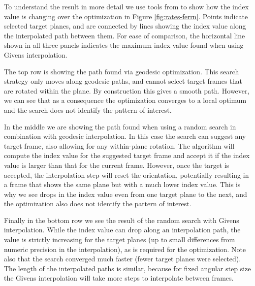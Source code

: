 To understand the result in more detail we use tools from
 \citep{ferrn} to show how the index value is changing
over the optimization in Figure \ref{fig:rates-ferrn}. Points indicate
selected target planes, and are connected by lines showing the index
value along the interpolated path between them. For ease of comparison,
the horizontal line shown in all three panels indicates the maximum
index value found when using Givens interpolation.

The top row is showing the path found via geodesic optimization. This
search strategy only moves along geodesic paths, and cannot select
target frames that are rotated within the plane. By construction this
gives a smooth path. However, we can see that as a consequence the
optimization converges to a local optimum and the search does not
identify the pattern of interest.

In the middle we are showing the path found when using a random search
in combination with geodesic interpolation. In this case the search can
suggest any target frame, also allowing for any within-plane rotation.
The algorithm will compute the index value for the suggested target
frame and accept it if the index value is larger than that for the
current frame. However, once the target is accepted, the interpolation
step will reset the orientation, potentially resulting in a frame that
shows the same plane but with a much lower index value. This is why we
see drops in the index value even from one target plane to the next, and
the optimization also does not identify the pattern of interest.

Finally in the bottom row we see the result of the random search with
Givens interpolation. While the index value can drop along an
interpolation path, the value is strictly increasing for the target
planes (up to small differences from numeric precision in the
interpolation), as is required for the optimization. Note also that the
search converged much faster (fewer target planes were selected). The
length of the interpolated paths is similar, because for fixed angular
step size the Givens interpolation will take more steps to interpolate
between frames.

